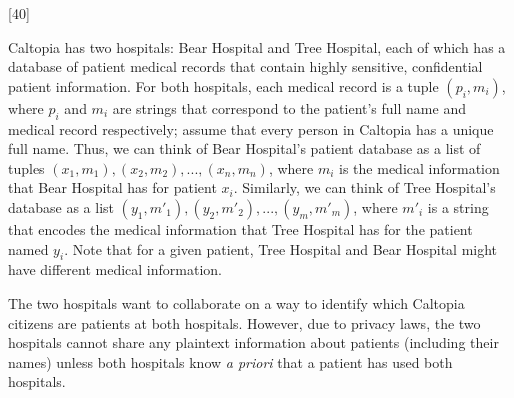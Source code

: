 \documentclass[12pt]{exam}
\newcommand{\checkbox}[3]{%
\iftoggle{pdfform}{%
\CheckBox[name = #1, backgroundcolor=white, bordercolor=black, #2]{}%
}{%
\ifprintanswers\else%
\framebox[0.6cm]{\rule{0pt}{0.4cm}#3}
\fi%
}%
}
\begin{document}
\begin{Form}
\begin{questions}

\newpage
{}[40]

Caltopia has two hospitals: Bear Hospital and Tree Hospital, each of which has
a database of patient medical records that contain highly sensitive, confidential patient information.
For both hospitals, each medical record is a tuple $(p_i, m_i)$, where
$p_i$ and $m_i$ are strings that correspond to the patient's full name and
medical record respectively;
assume that every person in Caltopia has a unique full name.
Thus, we can think of Bear Hospital's patient database as a list of tuples
$(x_1, m_1), (x_2, m_2),...,(x_n, m_n)$, where $m_i$ is the medical information
that Bear Hospital has for patient $x_i$.
Similarly, we can think of
Tree Hospital's database as a list $(y_1, m'_1), (y_2, m'_2),...,(y_m, m'_m)$,
where $m'_i$ is a string that encodes the medical information that Tree Hospital
has for the patient named $y_i$. Note that for a given patient, Tree Hospital
and Bear Hospital might have different medical information.

The two hospitals want to collaborate on a way to identify which Caltopia
citizens are patients at both hospitals.
However, due to privacy laws, the two hospitals cannot share any
plaintext information about patients (including their names) unless both
hospitals know \emph{a priori} that a patient has used both hospitals.


\end{questions}
\end{Form}
\end{document}
